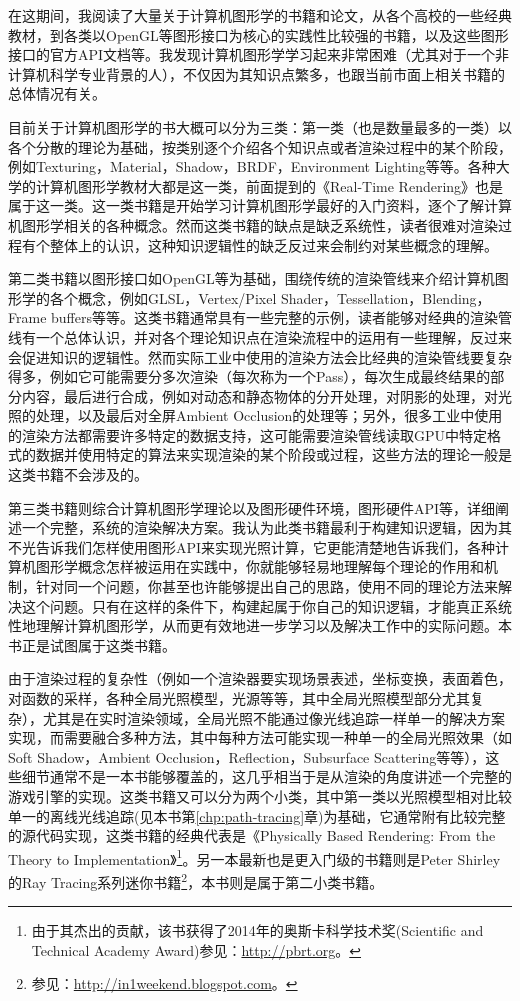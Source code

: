 在这期间，我阅读了大量关于计算机图形学的书籍和论文，从各个高校的一些经典教材，到各类以OpenGL等图形接口为核心的实践性比较强的书籍，以及这些图形接口的官方API文档等。我发现计算机图形学学习起来非常困难（尤其对于一个非计算机科学专业背景的人），不仅因为其知识点繁多，也跟当前市面上相关书籍的总体情况有关。

目前关于计算机图形学的书大概可以分为三类：第一类（也是数量最多的一类）以各个分散的理论为基础，按类别逐个介绍各个知识点或者渲染过程中的某个阶段，例如Texturing，Material，Shadow，BRDF，Environment Lighting等等。各种大学的计算机图形学教材大都是这一类，前面提到的《Real-Time Rendering》也是属于这一类。这一类书籍是开始学习计算机图形学最好的入门资料，逐个了解计算机图形学相关的各种概念。然而这类书籍的缺点是缺乏系统性，读者很难对渲染过程有个整体上的认识，这种知识逻辑性的缺乏反过来会制约对某些概念的理解。

第二类书籍以图形接口如OpenGL等为基础，围绕传统的渲染管线来介绍计算机图形学的各个概念，例如GLSL，Vertex/Pixel Shader，Tessellation，Blending，Frame buffers等等。这类书籍通常具有一些完整的示例，读者能够对经典的渲染管线有一个总体认识，并对各个理论知识点在渲染流程中的运用有一些理解，反过来会促进知识的逻辑性。然而实际工业中使用的渲染方法会比经典的渲染管线要复杂得多，例如它可能需要分多次渲染（每次称为一个Pass），每次生成最终结果的部分内容，最后进行合成，例如对动态和静态物体的分开处理，对阴影的处理，对光照的处理，以及最后对全屏Ambient Occlusion的处理等；另外，很多工业中使用的渲染方法都需要许多特定的数据支持，这可能需要渲染管线读取GPU中特定格式的数据并使用特定的算法来实现渲染的某个阶段或过程，这些方法的理论一般是这类书籍不会涉及的。

第三类书籍则综合计算机图形学理论以及图形硬件环境，图形硬件API等，详细阐述一个完整，系统的渲染解决方案。我认为此类书籍最利于构建知识逻辑，因为其不光告诉我们怎样使用图形API来实现光照计算，它更能清楚地告诉我们，各种计算机图形学概念怎样被运用在实践中，你就能够轻易地理解每个理论的作用和机制，针对同一个问题，你甚至也许能够提出自己的思路，使用不同的理论方法来解决这个问题。只有在这样的条件下，构建起属于你自己的知识逻辑，才能真正系统性地理解计算机图形学，从而更有效地进一步学习以及解决工作中的实际问题。本书正是试图属于这类书籍。

由于渲染过程的复杂性（例如一个渲染器要实现场景表述，坐标变换，表面着色，对函数的采样，各种全局光照模型，光源等等，其中全局光照模型部分尤其复杂），尤其是在实时渲染领域，全局光照不能通过像光线追踪一样单一的解决方案实现，而需要融合多种方法，其中每种方法可能实现一种单一的全局光照效果（如Soft Shadow，Ambient Occlusion，Reflection，Subsurface Scattering等等），这些细节通常不是一本书能够覆盖的，这几乎相当于是从渲染的角度讲述一个完整的游戏引擎的实现。这类书籍又可以分为两个小类，其中第一类以光照模型相对比较单一的离线光线追踪(见本书第\ref{chp:path-tracing}章)为基础，它通常附有比较完整的源代码实现，这类书籍的经典代表是《Physically Based Rendering: From the Theory to Implementation》\footnote{由于其杰出的贡献，该书获得了2014年的奥斯卡科学技术奖(Scientific and Technical Academy Award)参见：\url{http://pbrt.org}。}。另一本最新也是更入门级的书籍则是Peter Shirley的Ray Tracing系列迷你书籍\footnote{参见：\url{http://in1weekend.blogspot.com}。}，本书则是属于第二小类书籍。

